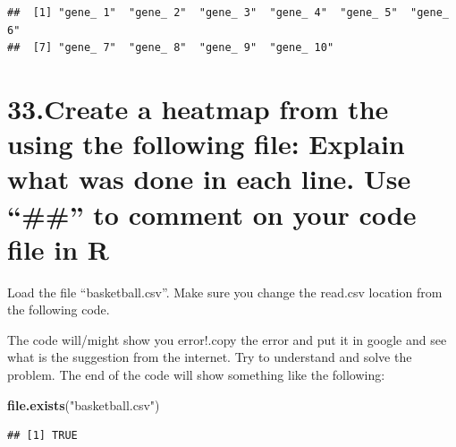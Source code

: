\documentclass[]{article}
\newenvironment{Shaded}{\begin{snugshade}}{\end{snugshade}}
\newcommand{\KeywordTok}[1]{\textcolor[rgb]{0.13,0.29,0.53}{\textbf{#1}}}
\newcommand{\NormalTok}[1]{#1}
\newcommand{\StringTok}[1]{\textcolor[rgb]{0.31,0.60,0.02}{#1}}
\begin{document}
\begin{verbatim}
##  [1] "gene_ 1"  "gene_ 2"  "gene_ 3"  "gene_ 4"  "gene_ 5"  "gene_ 6" 
##  [7] "gene_ 7"  "gene_ 8"  "gene_ 9"  "gene_ 10"
\end{verbatim}

\hypertarget{create-a-heatmap-from-the-using-the-following-file-explain-what-was-done-in-each-line.-use-to-comment-on-your-code-file-in-r}{%
\section{33.Create a heatmap from the using the following file: Explain
what was done in each line. Use ``\#\#'' to comment on your code file in
R}\label{create-a-heatmap-from-the-using-the-following-file-explain-what-was-done-in-each-line.-use-to-comment-on-your-code-file-in-r}}

Load the file ``basketball.csv''. Make sure you change the read.csv
location from the following code.

The code will/might show you error!.copy the error and put it in google
and see what is the suggestion from the internet. Try to understand and
solve the problem. The end of the code will show something like the
following:

\begin{Shaded}
\begin{Highlighting}[]
\KeywordTok{file.exists}\NormalTok{(}\StringTok{"basketball.csv"}\NormalTok{)}
\end{Highlighting}
\end{Shaded}

\begin{verbatim}
## [1] TRUE
\end{verbatim}
\end{document}
